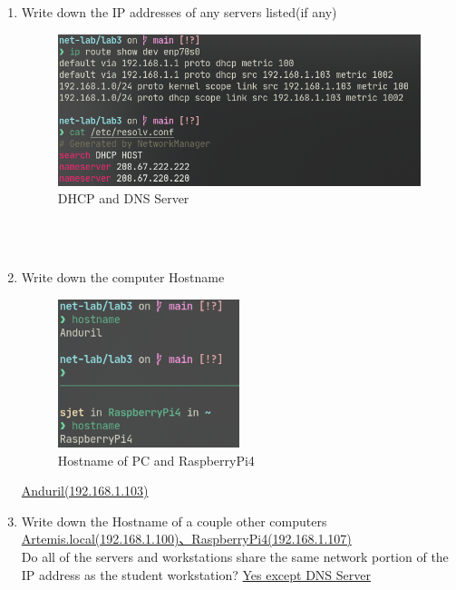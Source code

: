 \documentclass[a4paper]{ctexart}
\begin{document}
\begin{enumerate}
      \newpage
      \item Write down the IP addresses of any servers listed(if any)
      \begin{figure}[H]
        \includegraphics*[width=1.0\textwidth]{fig/dhcp.png}
        \caption[]{DHCP and DNS Server}
      \end{figure}
       \underline{}\\
       \underline{}\\
       \underline{}

      \item Write down the computer Hostname
      \begin{figure}[H]
        \centering \includegraphics*[width=0.5\textwidth]{fig/hostname.png}
        \caption[]{Hostname of PC and RaspberryPi4}
      \end{figure}
      \underline{Anduril(192.168.1.103)}

      \item Write down the Hostname of a couple other computers\\
      \underline{Artemis.local(192.168.1.100)、RaspberryPi4(192.168.1.107)}\\
      Do all of the servers and workstations share the same network portion of
      the IP address as the student workstation? \underline{Yes except DNS Server}


\end{enumerate}
\end{document}
